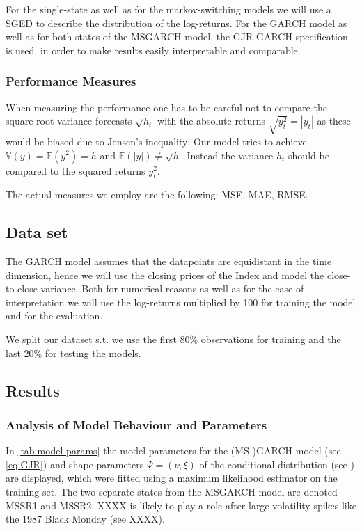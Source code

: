 \documentclass[11pt,a4paper]{article}
\begin{document}
For the single-state as well as for the markov-switching models we will use a \ac{SGED} to describe the distribution of the log-returns.
For the GARCH model as well as for both states of the MSGARCH model, the GJR-GARCH specification is used, in order to make results easily interpretable and comparable.

\subsubsection{Performance Measures}
When measuring the performance one has to be careful not to compare the square root variance forecasts $\sqrt{h_t}$ with the absolute returns $\sqrt{y_t^2} = | y_t |$ as these would be biased due to Jensen's inequality: Our model tries to achieve $\mathbb{V}(y) =\mathbb{E}(y^2) = h$ and $\mathbb{E}(| y |) \neq \sqrt{h}$. Instead the variance $h_t$ should be compared to the squared returns $y_t^2$.

The actual measures we employ are the following: \ac{MSE}, \ac{MAE}, \ac{RMSE}.

\subsection{Data set}
The GARCH model assumes that the datapoints are equidistant in the time dimension, hence we will use the closing prices of the Index and model the close-to-close variance. Both for numerical reasons as well as for the ease of interpretation we will use the log-returns multiplied by 100 for training the model and for the evaluation.

We split our dataset s.t. we use the first 80\% observations for training and the last 20\% for testing the models.


\subsection{Results}
\subsubsection{Analysis of Model Behaviour and Parameters}
In \cref{tab:model-params} the model parameters for the (MS-)GARCH model (see \cref{eq:GJR}) and shape parameters $\Psi = (\nu, \xi)$ of the conditional distribution (see ) are displayed, which were fitted using a maximum likelihood estimator on the training set. 
The two separate states from the MSGARCH model are denoted MSSR1 and MSSR2.
XXXX is likely to play a role after large volatility spikes like the 1987 Black Monday (see XXXX).
\end{document}
